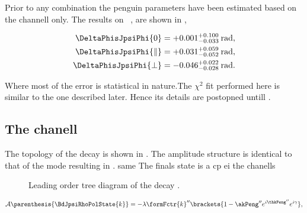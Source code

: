 
Prior to any combination the penguin parameters have been estimated based on the \BsJpsiKst channell only.
The results on ~\cite{bsjpsikst-paper}, are shown in ,

\begin{subequations}
  \label{delta_phis_jpsikst}
  \begin{align}
    \DeltaPhisJpsiPhi{0}         & = +0.001^{+0.100}_{-0.033} \:\text{rad},\\
    \DeltaPhisJpsiPhi{\parallel} & = +0.031^{+0.059}_{-0.052} \:\text{rad},\\
    \DeltaPhisJpsiPhi{\perp}     & = -0.046^{+0.022}_{-0.028} \:\text{rad}.
  \end{align}
\end{subequations}

\noindent Where most of the error is statistical in nature.The $\chi^2$ fit performed here is similar
to the one described later. Hence its details are postopned untill .


\subsection{The \BdJpsiRho chanell}
\label{bsjpsirho_chanell}

The topology of the \BdJpsiRho decay is shown in . The amplitude structure is identical
to that of the \BsJpsiKst mode resulting in . same The finals state is a cp ei the chanells

\begin{figure}[h]
  \centering
  {\sffamily }
  \caption{Leading order tree diagram of the decay \BdJpsiRho.}
  \label{bs2jpsirho_diagram}
\end{figure}

\begin{equation}
  \mathcal{A} \parenthesis{\BdJpsiRhoPolState{k}} = -\lambda \formFctr{k}'' \brackets{ 1 - \akPeng'' e^{i\thkPeng''} e^{i\gamma} },
  \label{bsjpsirho_amp}
\end{equation}

